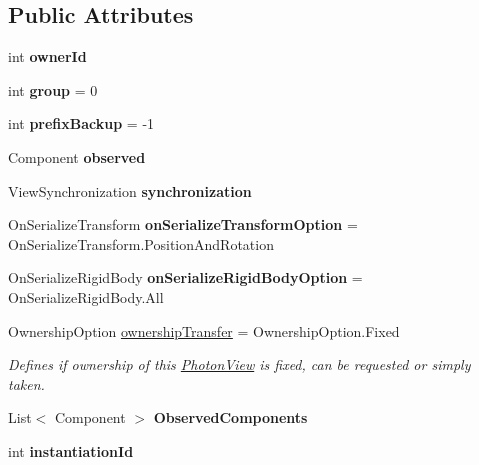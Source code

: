 \subsection*{Public Attributes}
\begin{DoxyCompactItemize}
\item 
int {\bfseries owner\+Id}\hypertarget{class_photon_view_af37a856ac051d3882de691851c7d2d08}{}\label{class_photon_view_af37a856ac051d3882de691851c7d2d08}

\item 
int {\bfseries group} = 0\hypertarget{class_photon_view_a9f8a7d9f0fa7703f07dcc2f0daf0e4db}{}\label{class_photon_view_a9f8a7d9f0fa7703f07dcc2f0daf0e4db}

\item 
int {\bfseries prefix\+Backup} = -\/1\hypertarget{class_photon_view_a3a3650071e812aca9b9cd518638ebd7d}{}\label{class_photon_view_a3a3650071e812aca9b9cd518638ebd7d}

\item 
Component {\bfseries observed}\hypertarget{class_photon_view_a7429864925f0716b072e8a7c4b23c59b}{}\label{class_photon_view_a7429864925f0716b072e8a7c4b23c59b}

\item 
View\+Synchronization {\bfseries synchronization}\hypertarget{class_photon_view_a634144e72774beb34d84c3ab7cac9cd4}{}\label{class_photon_view_a634144e72774beb34d84c3ab7cac9cd4}

\item 
On\+Serialize\+Transform {\bfseries on\+Serialize\+Transform\+Option} = On\+Serialize\+Transform.\+Position\+And\+Rotation\hypertarget{class_photon_view_a72f924cef0d24da2c542e80062cc3934}{}\label{class_photon_view_a72f924cef0d24da2c542e80062cc3934}

\item 
On\+Serialize\+Rigid\+Body {\bfseries on\+Serialize\+Rigid\+Body\+Option} = On\+Serialize\+Rigid\+Body.\+All\hypertarget{class_photon_view_a57eb2e5b6b3aea9e4ac6cc494dc19a27}{}\label{class_photon_view_a57eb2e5b6b3aea9e4ac6cc494dc19a27}

\item 
Ownership\+Option \hyperlink{class_photon_view_a29400fef2cf398230b2c63a7d66f6d9a}{ownership\+Transfer} = Ownership\+Option.\+Fixed
\begin{DoxyCompactList}\small\item\em Defines if ownership of this \hyperlink{class_photon_view}{Photon\+View} is fixed, can be requested or simply taken. \end{DoxyCompactList}\item 
List$<$ Component $>$ {\bfseries Observed\+Components}\hypertarget{class_photon_view_ae0c6ba75b4b849f41a2164c0ad7dbf8f}{}\label{class_photon_view_ae0c6ba75b4b849f41a2164c0ad7dbf8f}

\item 
int {\bfseries instantiation\+Id}\hypertarget{class_photon_view_aa32a59c1f2bd619673142ab75fc7c928}{}\label{class_photon_view_aa32a59c1f2bd619673142ab75fc7c928}

\end{DoxyCompactItemize}
